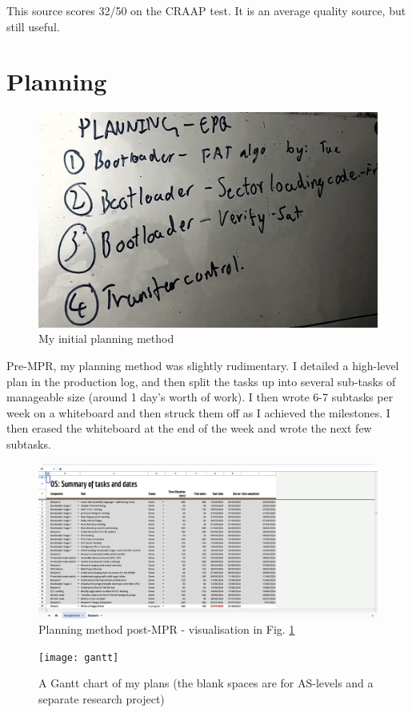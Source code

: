 \documentclass[a4paper,12pt]{article}
\begin{document}
This source scores 32/50 on the CRAAP test. It is an average quality source, but still useful.
\section{Planning}
\begin{figure}[H]
		\includegraphics[width=\textwidth]{planning}
\caption{My initial planning method}
\end{figure}

Pre-MPR, my planning method was slightly rudimentary. I detailed a high-level plan in the production log, and then split the tasks up into several sub-tasks of manageable size (around 1 day's worth of work). I then wrote 6-7 subtasks per week on a whiteboard and then struck them off as I achieved the milestones. I then erased the whiteboard at the end of the week and wrote the next few subtasks. \\

\begin{figure}
		\includegraphics[width=\textwidth]{plan-spreadsheet}
		\caption{Planning method post-MPR - visualisation in Fig. \ref{fig:gantt}}
\end{figure}
\begin{figure}\label{fig:gantt}
	\texttt{[image: gantt]}
	\caption{A Gantt chart of my plans (the blank spaces are for AS-levels and a separate research project)}
\end{figure}
\end{document}
